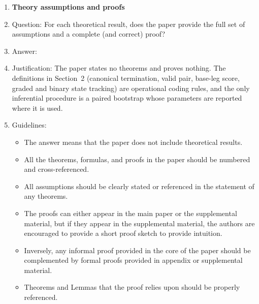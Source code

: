 \begin{enumerate}
\begin{itemize}
        \item The authors should discuss the computational efficiency of the proposed algorithms and how they scale with dataset size.
        \item If applicable, the authors should discuss possible limitations of their approach to address problems of privacy and fairness.
        \item While the authors might fear that complete honesty about limitations might be used by reviewers as grounds for rejection, a worse outcome might be that reviewers discover limitations that aren't acknowledged in the paper. The authors should use their best judgment and recognize that individual actions in favor of transparency play an important role in developing norms that preserve the integrity of the community. Reviewers will be specifically instructed to not penalize honesty concerning limitations.
    \end{itemize}

\item {\bf Theory assumptions and proofs}
    \item[] Question: For each theoretical result, does the paper provide the full set of assumptions and a complete (and correct) proof?
    \item[] Answer: \answerNA{}
    \item[] Justification: The paper states no theorems and proves nothing. The definitions in Section~2 (canonical termination, valid pair, base-leg score, graded and binary state tracking) are operational coding rules, and the only inferential procedure is a paired bootstrap whose parameters are reported where it is used.
    \item[] Guidelines:
    \begin{itemize}
        \item The answer \answerNA{} means that the paper does not include theoretical results. 
        \item All the theorems, formulas, and proofs in the paper should be numbered and cross-referenced.
        \item All assumptions should be clearly stated or referenced in the statement of any theorems.
        \item The proofs can either appear in the main paper or the supplemental material, but if they appear in the supplemental material, the authors are encouraged to provide a short proof sketch to provide intuition. 
        \item Inversely, any informal proof provided in the core of the paper should be complemented by formal proofs provided in appendix or supplemental material.
        \item Theorems and Lemmas that the proof relies upon should be properly referenced. 
    \end{itemize}


\end{enumerate}
